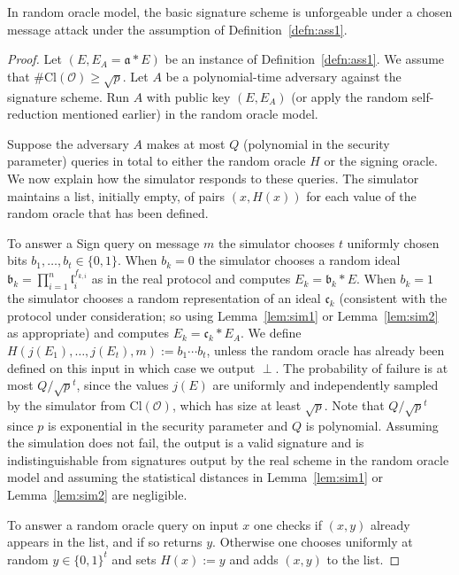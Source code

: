 \documentclass{llncs}
\newcommand{\OO}{\mathcal{O}}
\newcommand{\Cl}{\text{Cl}}
\renewcommand{\a}{\mathfrak{a}}
\renewcommand{\b}{\mathfrak{b}}
\renewcommand{\c}{\mathfrak{c}}
\renewcommand{\l}{\mathfrak{l}}
\begin{document}
\begin{theorem}\label{thm:security}
In random oracle model, the basic signature scheme is unforgeable under a chosen message attack under the assumption of Definition~\ref{defn:ass1}.
\end{theorem}

\begin{proof}
Let $(E, E_A = \a * E )$ be an instance of Definition~\ref{defn:ass1}.
We assume that $\#\Cl(\OO) \ge \sqrt{p}$.
Let $A$ be a polynomial-time adversary against the signature scheme.
Run $A$ with public key $(E, E_A)$ (or apply the random self-reduction mentioned earlier) in the random oracle model.

Suppose the adversary $A$ makes at most $Q$ (polynomial in the security parameter) queries in total to either the random oracle $H$ or the signing oracle. We now explain how the simulator responds to these queries. The simulator maintains a list, initially empty, of pairs $(x, H(x))$ for each value of the random oracle that has been defined.

To answer a Sign query on message $m$ the simulator chooses 
$t$ uniformly chosen bits $b_1, \dots, b_t \in \{0,1\}$.
When $b_k = 0$ the simulator chooses a random ideal $\b_k = \prod_{i=1}^n \l_i^{f_{k,i}}$ as in the real protocol and computes $E_k = \b_k * E$.
When $b_k = 1$ the simulator chooses a random representation of an ideal $\c_k$ (consistent with the protocol under consideration; so using Lemma~\ref{lem:sim1} or Lemma~\ref{lem:sim2} as appropriate) and computes $E_k = \c_k * E_A$.
We define $H( j( E_1), \dots, j(E_t), m ) := b_1 \cdots b_t$, unless the random oracle has already been defined on this input in which case we output $\perp$.
The probability of failure is at most $Q/\sqrt{p}^t$, since the values $j(E)$ are uniformly and independently sampled by the simulator from $\Cl(\OO)$, which has size at least $\sqrt{p}$.
Note that $Q/\sqrt{p}^t$ since $p$ is exponential in the security parameter and $Q$ is polynomial.
Assuming the simulation does not fail, the output is a valid signature and is indistinguishable from signatures output by the real scheme in the random oracle model and assuming the statistical distances in Lemma~\ref{lem:sim1} or Lemma~\ref{lem:sim2} are negligible.

To answer a random oracle query on input $x$ one checks if $(x,y)$ already appears in the list, and if so returns $y$. Otherwise one chooses uniformly at random $y \in \{0,1\}^t$ and sets $H(x) := y$ and adds $(x,y)$ to the list.


\end{proof}
\end{document}
